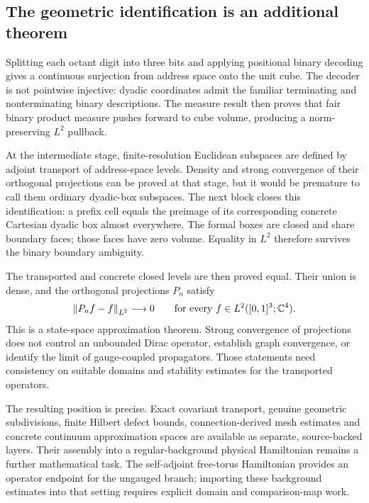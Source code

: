 
\subsection{The geometric identification is an additional theorem}
Splitting each octant digit into three bits and applying positional binary decoding gives a continuous surjection from address space onto the unit cube. The decoder is not pointwise injective: dyadic coordinates admit the familiar terminating and nonterminating binary descriptions. The measure result then proves that fair binary product measure pushes forward to cube volume, producing a norm-preserving $L^2$ pullback.

At the intermediate stage, finite-resolution Euclidean subspaces are defined by adjoint transport of address-space levels. Density and strong convergence of their orthogonal projections can be proved at that stage, but it would be premature to call them ordinary dyadic-box subspaces. The next block closes this identification: a prefix cell equals the preimage of its corresponding concrete Cartesian dyadic box almost everywhere. The formal boxes are closed and share boundary faces; those faces have zero volume. Equality in $L^2$ therefore survives the binary boundary ambiguity.

The transported and concrete closed levels are then proved equal. Their union is dense, and the orthogonal projections $P_n$ satisfy
\[
 \left\lVert P_nf-f\right\rVert_{L^2}\longrightarrow0
 \qquad\text{for every }f\in L^2([0,1]^3;\mathbb C^4).
\]
This is a state-space approximation theorem. Strong convergence of projections does not control an unbounded Dirac operator, establish graph convergence, or identify the limit of gauge-coupled propagators. Those statements need consistency on suitable domains and stability estimates for the transported operators.

The resulting position is precise. Exact covariant transport, genuine geometric subdivisions, finite Hilbert defect bounds, connection-derived mesh estimates and concrete continuum approximation spaces are available as separate, source-backed layers. Their assembly into a regular-background physical Hamiltonian remains a further mathematical task. The self-adjoint free-torus Hamiltonian provides an operator endpoint for the ungauged branch; importing these background estimates into that setting requires explicit domain and comparison-map work.


